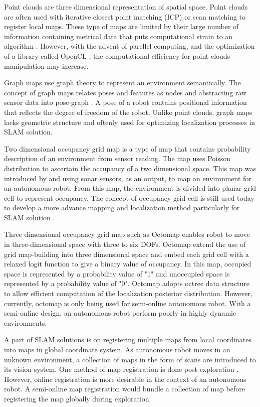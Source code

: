 \documentclass[a4paper,10pt]{article}
\begin{document}
Point clouds are three dimensional representation of spatial space. 
Point clouds are
often used with iterative closest point matching (ICP) or scan matching to
register local maps. These type of maps are limited by their large number of
information containing metrical data that puts computational strain to an
algorithm \citep{Olson2009}. However, with the advent of parellel computing,
and the optimization of a library called OpenCL \citep{Rusu2011}, the
computational efficiency for point clouds manipulation may increase.

Graph maps use graph theory to represent an environment semantically. The
concept of graph maps relates poses and features as nodes and abstracting raw
sensor data into pose-graph \citep{Grisetti}. A pose of a robot contains
positional information that reflects the degree of freedom of the robot.
Unlike point clouds, graph
maps lacks geometric structure and oftenly used for optimizing localization
processes in SLAM solution.

Two dimensional occupancy grid map is a type of map that contains probability description of an
environment from sensor reading. The map uses Poisson distribution to ascertain
the occupancy of a two dimensional space. This map was introduced by \citet{Moravec1988} and
\citet{Elfes1989} using sonar sensors, as an output, to map an environment for
an autonomous robot. From this map, the environment is divided into planar grid
cell to represent occupancy. The concept of occupancy grid cell is still used
today to develop a more advance mapping and localization method particularly for
SLAM solution \citep{Ray,Birk}. 

Three dimensional occupancy grid map such as Octomap \citep{Hornung2013} enables
robot to move in three-dimensional space with three to six DOFs. Octomap extend
the use of grid map-building into three dimensional space and embed each grid
cell with a relaxed logit function to give a binary value of occupancy. In this
map, occupied space is represented by a probability value of "1" and unoccupied
space is represented by a probability value of "0". Octomap adopts octree data
structure to allow efficient computation of the localization posterior
distribution. However, currently, octomap is only being used for semi-online
autonomous robot. With a semi-online design, an autonomous robot perform poorly
in highly dynamic environments. 

A part of SLAM solutions is on
registering multiple maps from local coordinates into maps in global coordinate
system. As autonomous robot moves in an unknown environment, a collection of
maps in the form of scans are introduced to its vision system. One method of
map registration is done post-exploration \citep{Burgard1999}. However, online
registration is more desirable in the context of an autonomous robot. A
semi-online map registration would bundle a collection of map before registering
the map globally during exploration. 
\end{document}
